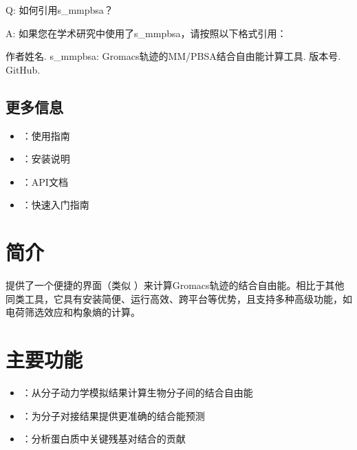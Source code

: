 \documentclass[letterpaper,10pt,english]{sphinxmanual}
\begin{document}
\sphinxAtStartPar
Q: 如何引用s\_mmpbsa？

\sphinxAtStartPar
A: 如果您在学术研究中使用了s\_mmpbsa，请按照以下格式引用：

\sphinxAtStartPar
作者姓名. s\_mmpbsa: Gromacs轨迹的MM/PB\sphinxhyphen{}SA结合自由能计算工具. 版本号. GitHub. 


\section{更多信息}
\label{\detokenize{faq:id7}}\begin{itemize}
\item {} 
\sphinxAtStartPar
{\hyperref[\detokenize{usage::doc}]{}}：使用指南

\item {} 
\sphinxAtStartPar
{\hyperref[\detokenize{installation::doc}]{}}：安装说明

\item {} 
\sphinxAtStartPar
{}：API文档

\item {} 
\sphinxAtStartPar
{\hyperref[\detokenize{quick_start::doc}]{}}：快速入门指南

\end{itemize}


\chapter{简介}
\label{\detokenize{index:id1}}
\sphinxAtStartPar
{} 提供了一个便捷的界面（类似 ）来计算Gromacs轨迹的结合自由能。相比于其他同类工具，它具有安装简便、运行高效、跨平台等优势，且支持多种高级功能，如电荷筛选效应和构象熵的计算。


\chapter{主要功能}
\label{\detokenize{index:id2}}\begin{itemize}
\item {} 
\sphinxAtStartPar
{}：从分子动力学模拟结果计算生物分子间的结合自由能

\item {} 
\sphinxAtStartPar
{}：为分子对接结果提供更准确的结合能预测

\item {} 
\sphinxAtStartPar
{}：分析蛋白质中关键残基对结合的贡献

\end{itemize}
\end{document}

